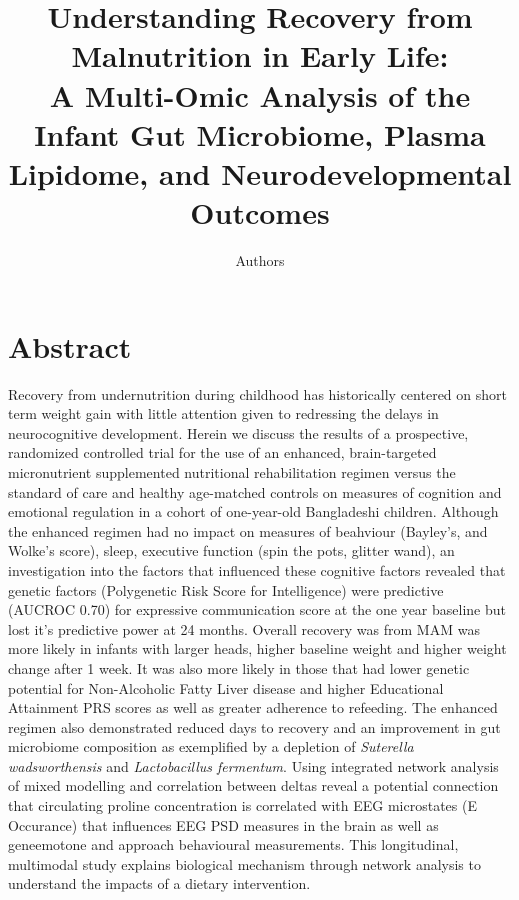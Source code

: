\documentclass{article}
\title{
  Understanding Recovery from Malnutrition in Early Life:\\
  A Multi-Omic Analysis of the Infant Gut Microbiome, Plasma Lipidome, and Neurodevelopmental Outcomes
}
\author[1]{Authors}
\affil[1]{Affiliations}
\date{}
\begin{document}
\maketitle

\newpage
\section*{Abstract}
Recovery from undernutrition during childhood has historically centered on short term weight gain with little attention given to redressing the delays in neurocognitive development.
Herein we discuss the results of a prospective, randomized controlled trial for the use of an enhanced, brain-targeted micronutrient supplemented nutritional rehabilitation regimen versus the standard of care and healthy age-matched controls on measures of cognition and emotional regulation in a cohort of one-year-old Bangladeshi children.
Although the enhanced regimen had no impact on measures of beahviour (Bayley's, and Wolke's score), sleep, executive function (spin the pots, glitter wand), an investigation into the factors that influenced these cognitive factors revealed that genetic factors (Polygenetic Risk Score for Intelligence) were predictive (AUCROC 0.70) for expressive communication score at the one year baseline but lost it's predictive power at 24 months.
Overall recovery was from MAM was more likely in infants with larger heads, higher baseline weight and higher weight change after 1 week.
It was also more likely in those that had lower genetic potential for Non-Alcoholic Fatty Liver disease and higher Educational Attainment PRS scores as well as greater adherence to refeeding. 
The enhanced regimen also demonstrated reduced days to recovery and an improvement in gut microbiome composition as exemplified by a depletion of \textit{Suterella wadsworthensis} and \textit{Lactobacillus fermentum}.
Using integrated network analysis of mixed modelling and correlation between deltas reveal a potential connection that circulating proline concentration is correlated with EEG microstates (E Occurance) that influences EEG PSD measures in the brain as well as geneemotone and approach behavioural measurements.
This longitudinal, multimodal study explains biological mechanism through network analysis to understand the impacts of a dietary intervention.

\newpage
\end{document}
